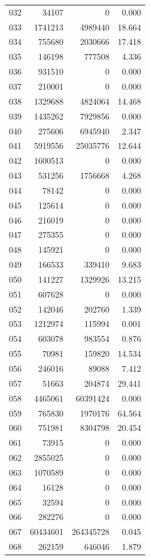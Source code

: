 \documentclass[anonymous,notoc]{gmcm2026}
\begin{document}
\begin{longtable}{lrrr}
032 & 34107 & 0 & 0.000 \\
033 & 1741213 & 4989440 & 18.664 \\
034 & 755680 & 2030666 & 17.418 \\
035 & 146198 & 777508 & 4.336 \\
036 & 931510 & 0 & 0.000 \\
037 & 210001 & 0 & 0.000 \\
038 & 1329688 & 4824064 & 14.468 \\
039 & 1435262 & 7929856 & 0.000 \\
040 & 275606 & 6945940 & 2.347 \\
041 & 5919556 & 25035776 & 12.644 \\
042 & 1600513 & 0 & 0.000 \\
043 & 531256 & 1756668 & 4.268 \\
044 & 78142 & 0 & 0.000 \\
045 & 125614 & 0 & 0.000 \\
046 & 216019 & 0 & 0.000 \\
047 & 275355 & 0 & 0.000 \\
048 & 145921 & 0 & 0.000 \\
049 & 166533 & 339410 & 9.683 \\
050 & 141227 & 1329926 & 13.215 \\
051 & 607628 & 0 & 0.000 \\
052 & 142046 & 202760 & 1.339 \\
053 & 1212974 & 115994 & 0.001 \\
054 & 603078 & 983554 & 0.876 \\
055 & 70981 & 159820 & 14.534 \\
056 & 246016 & 89088 & 7.412 \\
057 & 51663 & 204874 & 29.441 \\
058 & 4465061 & 60391424 & 0.000 \\
059 & 765830 & 1970176 & 64.564 \\
060 & 751981 & 8304798 & 20.454 \\
061 & 73915 & 0 & 0.000 \\
062 & 2855025 & 0 & 0.000 \\
063 & 1070589 & 0 & 0.000 \\
064 & 16128 & 0 & 0.000 \\
065 & 32594 & 0 & 0.000 \\
066 & 282276 & 0 & 0.000 \\
067 & 60434601 & 264345728 & 0.045 \\
068 & 262159 & 646046 & 1.879 \\

\end{longtable}
\end{document}
